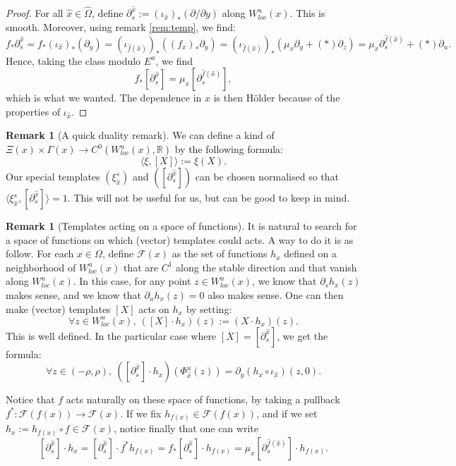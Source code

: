 \documentclass[a4paper]{article}
\theoremstyle{definition}
\newtheorem{remark}[example]{Remark}
\begin{document}
\begin{proof}
For all ${\widehat{x}} \in \widehat{\Omega}$, define $\partial_s^{\widehat{x}} := (\iota_{\widehat{x}})_*(\partial/\partial y)$ along $W^u_{loc}(x)$. This is smooth. Moreover, using remark \ref{rem:temp}, we find:
$$ f_* \partial_s^{\widehat{x}} = f_* (\iota_{\widehat{x}})_*(\partial_y)= (\iota_{\widehat{f}({\widehat{x}})})_* ((f_x)_* \partial_y) = (\iota_{\widehat{f}({\widehat{x}})})_* ( \mu_x \partial_y + (*) \partial_z ) = \mu_x \partial_s^{\widehat{f}({\widehat{x}})} + (*) \partial_u .$$
Hence, taking the class modulo $E^u$, we find
$$ f_*[\partial_s^{\widehat{x}}] = \mu_x [\partial_{s}^{\widehat{f}({\widehat{x}})}] ,$$
which is what we wanted. The dependence in ${\widehat{x}}$ is then Hölder because of the properties of $\iota_{\widehat{x}}$.
\end{proof}

\begin{remark}[A quick duality remark]
We can define a kind of  \newline $\Xi(x) \times \Gamma(x) \rightarrow C^0(W^u_{loc}(x),\mathbb{R})$ by the following formula:
$$ \langle \xi , [X] \rangle := \xi(X) .$$
Our special templates $(\xi_{\widehat{x}}^s)$ and $([\partial_s^{\widehat{x}}])$ can be chosen normalised so that $\langle \xi_{\widehat{x}}^s, [\partial_s^{\widehat{x}}] \rangle = 1$. This will not be useful for us, but can be good to keep in mind.
\end{remark}

\begin{remark}[Templates acting on a space of functions]\label{rem:functions}
It is natural to search for a space of functions on which (vector) templates could acts. A way to do it is as follow.
For each $x \in \Omega$, define $\mathcal{F}(x)$ as the set of functions $h_x$ defined on a neighborhood of $W^u_{loc}(x)$ that are $C^1$ along the stable direction and that vanish along $W^u_{loc}(x)$. In this case, for any point $z \in W^u_{loc}(x)$, we know that $\partial_s h_x(z)$ makes sense, and we know that $\partial_u h_x(z) = 0$ also makes sense. One can then make (vector) templates $[X]$ acts on $h_x$ by setting:
$$\forall z \in W^u_{loc}(x), \  ([X] \cdot h_x)(z) := (X \cdot h_x)(z) .$$
This is well defined.
In the particular case where $[X] = [\partial_s^{\widehat{x}}]$, we get the formula:
$$ \forall z \in (-\rho,\rho), \ ([\partial_s^{\widehat{x}}] \cdot h_x)(\Phi_{{\widehat{x}}}^u(z)) = \partial_y (h_x \circ \iota_{\widehat{x}})(z,0) .$$

Notice that $f$ acts naturally on these space of functions, by taking a pullback $f^* : \mathcal{F}(f(x)) \rightarrow \mathcal{F}(x)$. If we fix $h_{f(x)} \in \mathcal{F}(f(x))$, and if we set $h_x := h_{f(x)} \circ f \in \mathcal{F}(x)$, notice finally that one can write
$$ [\partial_s^{\widehat{x}}] \cdot h_{x} = [\partial_s^{\widehat{x}}] \cdot f^*h_{f(x)} = f_* [\partial_s^{\widehat{x}}] \cdot h_{f(x)} = \mu_x [\partial_s^{\widehat{f}({\widehat{x}})}] \cdot h_{f(x)}.$$
\end{remark}
\end{document}
